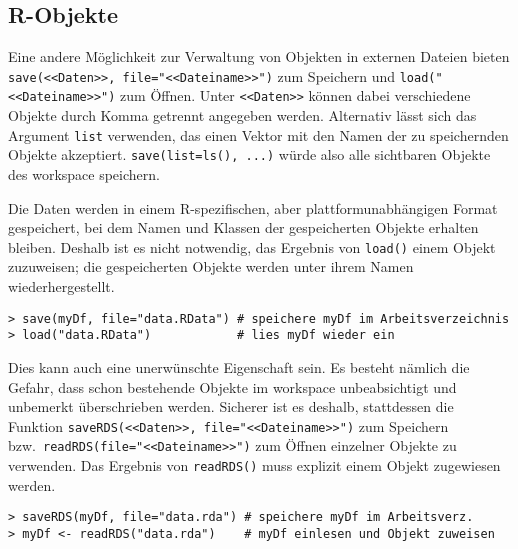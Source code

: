\subsection{R-Objekte}
\label{sec:saveRDS}

Eine andere Möglichkeit zur Verwaltung von Objekten in externen Dateien bieten \lstinline!save(<<Daten>>, file="<<Dateiname>>")! zum Speichern und \lstinline!load("<<Dateiname>>")! zum Öffnen. Unter \lstinline!<<Daten>>! können dabei verschiedene Objekte durch Komma getrennt angegeben werden. Alternativ lässt sich das Argument \lstinline!list! verwenden, das einen Vektor mit den Namen der zu speichernden Objekte akzeptiert. \lstinline!save(list=ls(), ...)! würde also alle sichtbaren Objekte des workspace speichern.

Die Daten werden in einem R-spezifischen, aber plattformunabhängigen Format gespeichert, bei dem Namen und Klassen der gespeicherten Objekte erhalten bleiben. Deshalb ist es nicht notwendig, das Ergebnis von \lstinline!load()! einem Objekt zuzuweisen; die gespeicherten Objekte werden unter ihrem Namen wiederhergestellt.
\begin{lstlisting}
> save(myDf, file="data.RData") # speichere myDf im Arbeitsverzeichnis
> load("data.RData")            # lies myDf wieder ein
\end{lstlisting}
  
Dies kann auch eine unerwünschte Eigenschaft sein. Es besteht nämlich die Gefahr, dass schon bestehende Objekte im workspace unbeabsichtigt und unbemerkt überschrieben werden. Sicherer ist es deshalb, stattdessen die Funktion \lstinline!saveRDS(<<Daten>>, file="<<Dateiname>>")! zum Speichern bzw.\ \lstinline!readRDS(file="<<Dateiname>>")! zum Öffnen einzelner Objekte zu verwenden. Das Ergebnis von \lstinline!readRDS()! muss explizit einem Objekt zugewiesen werden.
\begin{lstlisting}
> saveRDS(myDf, file="data.rda") # speichere myDf im Arbeitsverz.
> myDf <- readRDS("data.rda")    # myDf einlesen und Objekt zuweisen
\end{lstlisting}

